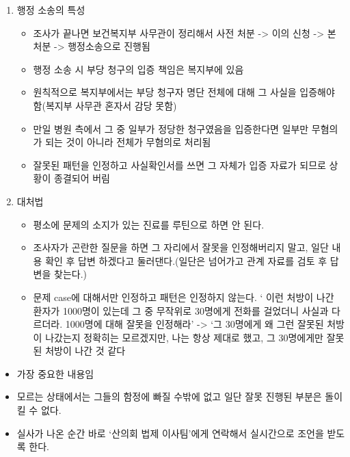 \begin{enumerate}[①]\tightlist
\item 행정 소송의 특성
	\begin{itemize}\tightlist
	\item 조사가 끝나면 보건복지부 사무관이 정리해서 사전 처분
    -> 이의 신청 -> 본 처분 -> 행정소송으로 진행됨
	\item 행정 소송 시 부당 청구의 입증 책임은 복지부에 있음
	\item  원칙적으로 복지부에서는 부당 청구자 명단 전체에 대해 그 사실을 입증해야 함(복지부 사무관 혼자서 감당 못함)
	\item 만일 병원 측에서 그 중 일부가 정당한 청구였음을 입증한다면 일부만 무혐의가 되는 것이 아니라 전체가 무혐의로 처리됨
	\item  잘못된 패턴을 인정하고 사실확인서를 쓰면 그 자체가 입증 자료가 되므로 상황이 종결되어 버림
	\end{itemize}
\item 대처법
	\begin{itemize}\tightlist
	\item 평소에 문제의 소지가 있는 진료를 루틴으로 하면 안 된다.
	\item 조사자가 곤란한 질문을 하면 그 자리에서 잘못을 인정해버리지 말고, 일단 내용 확인 후 답변 하겠다고 둘러댄다.(일단은 넘어가고 관계 자료를 검토 후 답변을 찾는다.)
	\item 문제 case에 대해서만 인정하고 패턴은 인정하지 않는다.
     ‘ 이런 처방이 나간 환자가 1000명이 있는데 그 중 무작위로 30명에게 전화를 걸었더니 사실과 다르더라. 1000명에 대해 잘못을 인정해라’ -> ‘그 30명에게 왜 그런 잘못된 처방이 나갔는지 정확히는 모르겠지만, 나는 항상 제대로 했고, 그 30명에게만 잘못된 처방이 나간 것 같다
	 \end{itemize}
\end{enumerate}
	 
\begin{itemize}\tightlist
\item 가장 중요한 내용임
\item 모르는 상태에서는 그들의 함정에 빠질 수밖에 없고 일단 잘못 진행된 부분은 돌이킬 수 없다.
\item 실사가 나온 순간 바로 ‘산의회 법제 이사팀’에게 연락해서 실시간으로 조언을 받도록 한다.
\end{itemize}	 